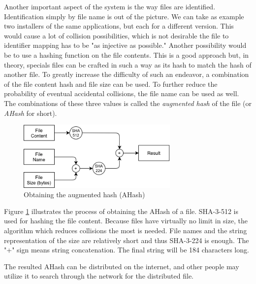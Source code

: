 Another important aspect of the system is the way files are identified. 
Identification simply by file name is out of the picture. We can take as 
example two installers of the same applications, but each for a different 
version. This would cause a lot of collision possibilities, which is not 
desirable the file to identifier mapping has to be "as injective as possible." 
Another possibility would be to use a hashing function on the file contents. 
This is a good approach but, in theory, specials files can be crafted in such a 
way as its hash to match the hash of another file. To greatly increase the 
difficulty of such an endeavor, a combination of the file content hash and file 
size can be used. To further reduce the probability of eventual accidental 
collisions, the file name can be used as well. The combinations of these three 
values is called the \textit{augmented hash} of the file (or \textit{AHash} for 
short).

\begin{figure}
    \centering
    \includegraphics[width=0.7\textwidth]{figures/fig3}
    \caption{Obtaining the augmented hash (AHash)}
    \label{fig:fig3}
\end{figure}

Figure \ref{fig:fig3} illustrates the process of obtaining the AHash of a file. 
SHA-3-512 is used for hashing the file content. Because files have virtually no 
limit in size, the algorithm which reduces collisions the most is needed. File 
names and the string representation of the size are relatively short and thus 
SHA-3-224 is enough. The "+" sign means string concatenation. The final string 
will be 184 characters long.

The resulted AHash can be distributed on the internet, and other people may 
utilize it to search through the network for the distributed file.
